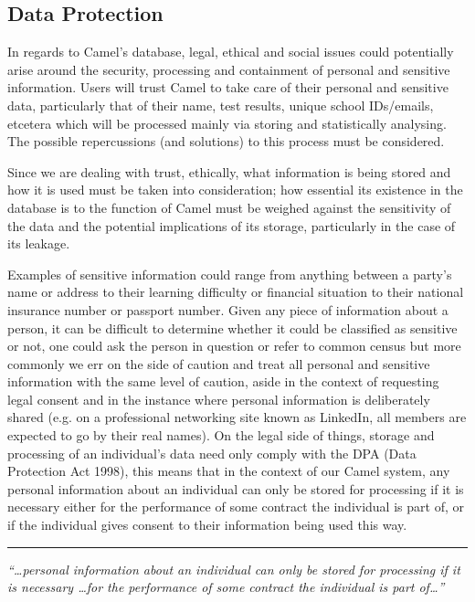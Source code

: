 \subsection*{Data Protection}
In regards to Camel’s database, legal, ethical and social issues could potentially arise around the security, processing and containment of personal and sensitive information. Users will trust Camel to take care of their personal and sensitive data, particularly that of their name, test results, unique school IDs/emails, etcetera which will be processed mainly via storing and statistically analysing. The possible repercussions (and solutions) to this process must be considered.

Since we are dealing with trust, ethically, what information is being stored and how it is used must be taken into consideration; how essential its existence in the database is to the function of Camel must be weighed against the sensitivity of the data and the potential implications of its storage, particularly in the case of its leakage.

Examples of sensitive information could range from anything between a party’s name or address to their learning difficulty or financial situation to their national insurance number or passport number. Given any piece of information about a person, it can be difficult to determine whether it could be classified as sensitive or not, one could ask the person in question or refer to common census but more commonly we err on the side of caution and treat all personal and sensitive information with the same level of caution, aside in the context of requesting legal consent and in the instance where personal information is deliberately shared (e.g. on a professional networking site known as LinkedIn, all members are expected to go by their real names).
    On the legal side of things, storage and processing of an individual’s data need only comply with the DPA (Data Protection Act 1998), this means that in the context of our Camel system, any personal information about an individual can only be stored for processing if it is necessary either for the performance of some contract the individual is part of, or if the individual gives consent to their information being used this way.\cite{DPA:tDPP:S1}\cite{DPA:tDPP:S2}

\vspace{0.2cm}
\hrule
\begin{center}
\small \em “\ldots personal information about an individual can only be stored for processing if it is necessary \ldots for the performance of some contract the individual is part of…”
\end{center}

